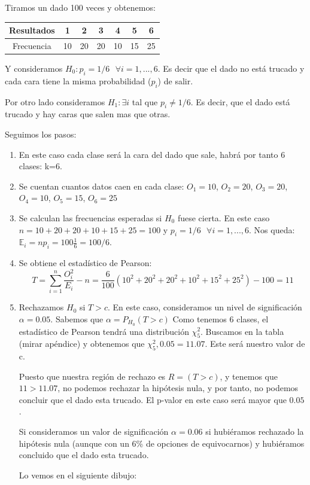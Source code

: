 \documentclass[nochap]{apuntes}
\begin{document}
\begin{example}
Tiramos un dado 100 veces y obtenemos:

\begin{tabular}{|c|c|c|c|c|c|c|}
\hline
Resultados & 1 & 2 & 3 & 4 & 5 & 6 \\
\hline
Frecuencia & 10 & 20 & 20 & 10 & 15 & 25\\
\hline
\end{tabular}

Y consideramos $H_0: p_i=1/6 \text{ } \forall i=1,...,6$. Es decir que el dado no está trucado y cada cara tiene la misma probabilidad ($p_i$) de salir.

Por otro lado consideramos $H_1: \exists i$ tal que $p_i\neq 1/6$. Es decir, que el dado está trucado y hay caras que salen mas que otras.

Seguimos los pasos:
\begin{enumerate}
\item En este caso cada clase será la cara del dado que sale, habrá por tanto 6 clases: k=6.
\item Se cuentan cuantos datos caen en cada clase: $O_1=10$, $O_2=20$, $O_3=20$, $O_4=10$, $O_5=15$, $O_6=25$
\item Se calculan las frecuencias esperadas si $H_0$ fuese cierta. En este caso $n=10+20+20+10+15+25=100$ y $p_i=1/6 \text{ } \forall i=1,...,6$. Nos queda: $\mathbb{E}_i=np_i = 100 \frac{1}{6}=100/6$.
\item Se obtiene el estadístico de Pearson:
\[
T=\sum_{i=1}^n \frac{O_i^2}{E_i}-n = \frac{6}{100}(10^2+20^2+20^2+10^2+15^2+25^2)-100=11
\]
\item Rechazamos $H_0$ si $T>c$. En este caso, consideramos un nivel de significación $\alpha = 0.05$. Sabemos que $\alpha = P_{H_0}(T>c)$ Como tenemos 6 clases, el estadístico de Pearson tendrá una distribución $\chi^2_5$. Buscamos en la tabla (mirar apéndice) y obtenemos que $\chi^2_5, 0.05 = 11.07$. Este será nuestro valor de c.

Puesto que nuestra región de rechazo es $R=(T>c)$, y tenemos que $11>11.07$, no podemos rechazar la hipótesis nula, y por tanto, no podemos concluir que el dado esta trucado. El p-valor en este caso será mayor que $0.05$.

Si consideramos un valor de significación $\alpha = 0.06$ si hubiéramos rechazado la hipótesis nula (aunque con un 6\% de opciones de equivocarnos) y hubiéramos concluido que el dado esta trucado. 

Lo vemos en el siguiente dibujo:


\end{enumerate}
\end{example}
\end{document}
